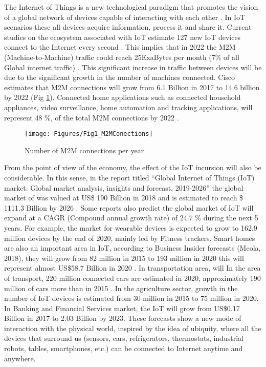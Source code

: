 The Internet of Things is a new technological paradigm that promotes the vision of a global network of devices capable of interacting with each other \cite{Gubbi2013,Lee2015}. In IoT scenarios these all devices acquire information, process it and share it. Current studies on the ecosystem associated with IoT estimate 127 new IoT devices connect to the Internet every second \cite{Lucero2016}. This implies that in 2022 the M2M (Machine-to-Machine) traffic could reach 25ExaBytes per month (7\% of all Global internet traffic) \cite{Cisco2019}. This significant increase in traffic between devices will be due to the significant growth in the number of machines connected. Cisco estimates that M2M connections will grow from 6.1 Billion in 2017 to 14.6 billion by 2022 (Fig \ref{ch5_fig:1}). Connected home applications such as connected household appliances, video surveillance, home automation and tracking applications, will represent 48 \%, of the total M2M connections by 2022 \cite{Cisco2019}. 
%
\begin{figure}[ht!]
\centering
\texttt{[image: Figures/Fig1\_M2MConections]}
\caption{Number of M2M connections per year}
\label{ch5_fig:1}       %
\end{figure}

From the point of view of the economy, the effect of the IoT incursion will also be considerable. In this sense, in the report titled “Global Internet of Things (IoT) market: Global market analysis, insights and forecast, 2019-2026” \cite{FBI2019} the global market of was valued at US\$ 190 Billion in 2018 and is estimated to reach \$ 1111.3 Billion by 2026 \cite{USAIDCC2019}. Some reports also predict the global market of IoT will expand at a CAGR (Compound annual growth rate) of 24.7 \% during the next 5 years. For example, the market for wearable devices is expected to grow to 162.9 million devices by the end of 2020, mainly led by Fitness trackers. Smart homes are also an important area in IoT, according to Business Insider forecasts (Meola, 2018), they will grow from 82 million in 2015 to 193 million in 2020 this will represent almost US\$58.7 Billion in 2020 \cite{Statista2018}. In transportation area, will In the area of transport, 220 million connected cars are estimated in 2020, approximately 190 million of cars more than in 2015 \cite{Meola2018}. In the agriculture sector, growth in the number of IoT devices is estimated from 30 million in 2015 to 75 million in 2020. In Banking and Financial Services market, the IoT will grow from US\$0.17 Billion in 2017 to 2.03 Billion by 2023. These forecasts show a new mode of interaction with the physical world, inspired by the idea of ubiquity, where all the devices that surround us (sensors, cars, refrigerators, thermostats, industrial robots, tables, smartphones, etc.) can be connected to Internet anytime and anywhere. 

